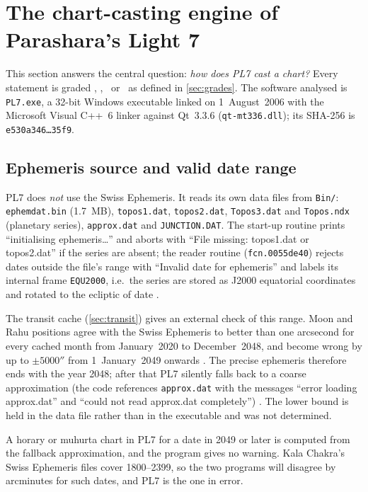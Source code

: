 \section{The chart-casting engine of Parashara's Light 7}
\label{sec:engine}

This section answers the central question: \emph{how does PL7 cast a chart?} Every
statement is graded \tagBIN, \tagNUM, \tagDOC\ or \tagINF\ as defined in
\autoref{sec:grades}. The software analysed is \texttt{PL7.exe}, a 32-bit Windows
executable linked on 1~August~2006 with the Microsoft Visual C++~6 linker against Qt~3.3.6
(\texttt{qt-mt336.dll}); its SHA-256 is \texttt{e530a346\ldots 35f9}.

\subsection{Ephemeris source and valid date range}
\label{sec:ephem}

PL7 does \emph{not} use the Swiss Ephemeris. It reads its own data files from
\texttt{Bin/}: \texttt{ephemdat.bin} (1.7~MB), \texttt{topos1.dat}, \texttt{topos2.dat},
\texttt{Topos3.dat} and \texttt{Topos.ndx} (planetary series), \texttt{approx.dat} and
\texttt{JUNCTION.DAT}. The start-up routine prints ``initialising ephemeris\ldots'' and
aborts with ``File missing: topos1.dat or topos2.dat'' if the series are absent; the
reader routine (\texttt{fcn.0055de40}) rejects dates outside the file's range with
``Invalid date for ephemeris'' and labels its internal frame \texttt{EQU2000}, i.e.\ the
series are stored as J2000 equatorial coordinates and rotated to the ecliptic of date
\tagBIN.

The transit cache (\autoref{sec:transit}) gives an external check of this range. Moon and
Rahu positions agree with the Swiss Ephemeris to better than one arcsecond for every
cached month from January~2020 to December~2048, and become wrong by up to
$\pm 5000''$ from 1~January~2049 onwards \tagNUM. The precise ephemeris therefore ends
with the year 2048; after that PL7 silently falls back to a coarse approximation
(the code references \texttt{approx.dat} with the messages ``error loading approx.dat''
and ``could not read approx.dat completely'') \tagINF. The lower bound is held in the
data file rather than in the executable and was not determined.

\begin{warnbox}\kpit A horary or muhurta chart in PL7 for a date in 2049 or later is computed
from the fallback approximation, and the program gives no warning. Kala Chakra's Swiss
Ephemeris files cover 1800--2399, so the two programs will disagree by arcminutes for
such dates, and PL7 is the one in error.\end{warnbox}

